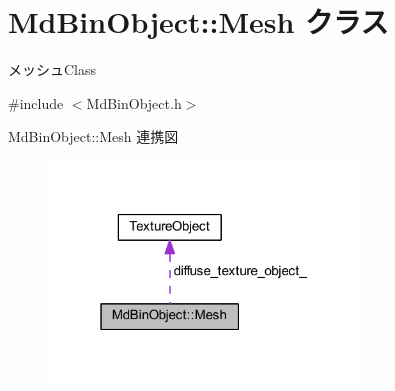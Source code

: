 \hypertarget{class_md_bin_object_1_1_mesh}{}\section{Md\+Bin\+Object\+:\+:Mesh クラス}
\label{class_md_bin_object_1_1_mesh}


メッシュ\+Class  




{\ttfamily \#include $<$Md\+Bin\+Object.\+h$>$}



Md\+Bin\+Object\+:\+:Mesh 連携図\nopagebreak
\begin{figure}[H]
\begin{center}
\leavevmode
\includegraphics[width=235pt]{class_md_bin_object_1_1_mesh__coll__graph}
\end{center}
\end{figure}
